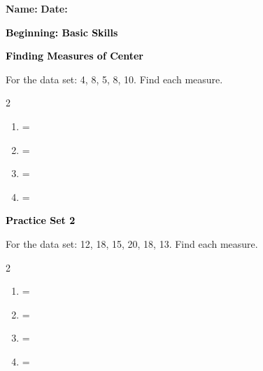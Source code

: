 \documentclass[12pt, letterpaper, fleqn]{article}
\newcommand{\blank}{\underline{\hspace{2.2cm}}}
\begin{document}
\textbf{Name:} \underline{\hspace{5cm}}
\hfill
\textbf{Date:} \underline{\hspace{3cm}}\\

\begin{tcolorbox}[colback=customteal!20]
    \large\textcolor{black}{\textbf{Beginning: Basic Skills}}
\end{tcolorbox}

\vspace{3mm}

\begin{tcolorbox}[colback=customteal!20]
\large\textcolor{black}{\textbf{Finding Measures of Center}}
\end{tcolorbox}

\noindent
For the data set: 4, 8, 5, 8, 10. Find each measure.

\vspace{3mm}
\begin{multicols}{2}
\begin{enumerate}[itemsep=1cm, leftmargin=0.6cm]
\item {} = \blank
\item {} = \blank
\item {} = \blank
\item {} = \blank
\end{enumerate}
\end{multicols}
\newpage

\begin{tcolorbox}[colback=customteal!20]
\large\textcolor{black}{\textbf{Practice Set 2}}
\end{tcolorbox}

\noindent
For the data set: 12, 18, 15, 20, 18, 13. Find each measure.

\vspace{3mm}
\begin{multicols}{2}
\begin{enumerate}[itemsep=1cm, leftmargin=0.6cm]
\item {} = \blank
\item {} = \blank
\item {} = \blank
\item {} = \blank
\end{enumerate}
\end{multicols}
\newpage
\end{document}

